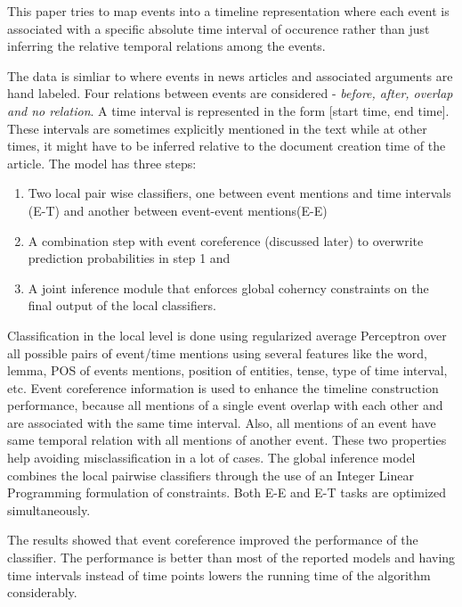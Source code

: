 
This paper tries to map events into a timeline representation where each event is associated with a specific absolute time interval of occurence rather than just inferring the relative temporal relations among the events. 

The data is simliar to \citeauthor{temporalordering} where events in news articles and associated arguments are hand labeled. Four relations between events are considered - {\em before, after, overlap and no relation}. A time interval is represented in the form [start time, end time]. These intervals are sometimes explicitly mentioned in the text while at other times, it might have to be inferred relative to the document creation time of the article. The model has three steps: 
\begin{enumerate}
\item Two local pair wise classifiers, one between event mentions and time intervals (E-T) and another between event-event mentions(E-E) 
\item A combination step with event coreference (discussed later) to overwrite prediction probabilities in step 1 and 
\item A joint inference  module that enforces global coherncy constraints on the final output of the local classifiers. 
\end{enumerate}

Classification in the local level is done using regularized average Perceptron over all possible pairs of event/time mentions using several features like the word, lemma, POS of events mentions, position of entities, tense, type of time interval, etc. Event coreference information is used to enhance the timeline construction performance, because all mentions of a single event overlap with each other and are associated with the same time interval. Also, all mentions of an event have same temporal relation with all mentions of another event. These two properties help avoiding misclassification in a lot of cases. The global inference model combines the local pairwise classifiers through the use of an Integer Linear Programming formulation of constraints. Both E-E and E-T tasks are optimized simultaneously. 

The results showed that event coreference improved the performance of the classifier. The performance is better than most of the reported models and having time intervals instead of time points lowers the running time of the algorithm considerably. 


